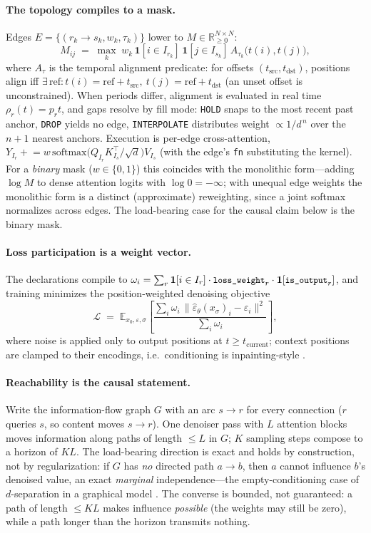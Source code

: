 \documentclass[10pt,twocolumn]{article}
\newcommand{\code}[1]{\texttt{\small #1}}
\begin{document}
\paragraph{The topology compiles to a mask.} Edges $E=\{(r_k{\to}s_k, w_k, \tau_k)\}$ lower to $M\in\mathbb{R}_{\ge0}^{N\times N}$:
\[
M_{ij} \;=\; \max_{k}\; w_k\,\mathbf{1}[i\in I_{r_k}]\,\mathbf{1}[j\in I_{s_k}]\,A_{\tau_k}\!\big(t(i),t(j)\big),
\]
where $A_\tau$ is the temporal alignment predicate: for offsets $(t_{\text{src}},t_{\text{dst}})$, positions align iff $\exists\,\text{ref}: t(i)=\text{ref}+t_{\text{src}},\ t(j)=\text{ref}+t_{\text{dst}}$ (an unset offset is unconstrained). When periods differ, alignment is evaluated in real time $\rho_r(t)=p_r t$, and gaps resolve by fill mode: \code{HOLD} snaps to the most recent past anchor, \code{DROP} yields no edge, \code{INTERPOLATE} distributes weight $\propto 1/d^{\,n}$ over the $n{+}1$ nearest anchors. Execution is per-edge cross-attention, $Y_{I_r} \mathrel{+}= w\,\mathrm{softmax}\!\big(Q_{I_r}K_{I_s}^{\top}/\sqrt{d}\big)V_{I_s}$ (with the edge's \code{fn} substituting the kernel). For a \emph{binary} mask ($w\in\{0,1\}$) this coincides with the monolithic form---adding $\log M$ to dense attention logits with $\log 0=-\infty$; with unequal edge weights the monolithic form is a distinct (approximate) reweighting, since a joint softmax normalizes across edges. The load-bearing case for the causal claim below is the binary mask.

\paragraph{Loss participation is a weight vector.} The declarations compile to $\omega_i=\sum_r \mathbf{1}[i\in I_r]\cdot\code{loss\_weight}_r\cdot\mathbf{1}[\code{is\_output}_r]$, and training minimizes the position-weighted denoising objective
\[
\mathcal{L} \;=\; \mathbb{E}_{x_0,\varepsilon,\sigma}\!\left[\frac{\sum_i \omega_i\,\big\lVert \hat\varepsilon_\theta(x_\sigma)_i-\varepsilon_i\big\rVert^2}{\sum_i \omega_i}\right],
\]
where noise is applied only to output positions at $t\ge t_{\text{current}}$; context positions are clamped to their encodings, i.e.\ conditioning is inpainting-style \cite{ho2020ddpm,song2021score}.

\paragraph{Reachability is the causal statement.} Write the information-flow graph $G$ with an arc $s\to r$ for every connection ($r$ queries $s$, so content moves $s\to r$). One denoiser pass with $L$ attention blocks moves information along paths of length $\le L$ in $G$; $K$ sampling steps compose to a horizon of $KL$. The load-bearing direction is exact and holds by construction, not by regularization: if $G$ has \emph{no} directed path $a\to b$, then $a$ cannot influence $b$'s denoised value, an exact \emph{marginal} independence---the empty-conditioning case of $d$-separation in a graphical model \cite{koller2009pgm,pearl2009causality}. The converse is bounded, not guaranteed: a path of length $\le KL$ makes influence \emph{possible} (the weights may still be zero), while a path longer than the horizon transmits nothing.
\end{document}
